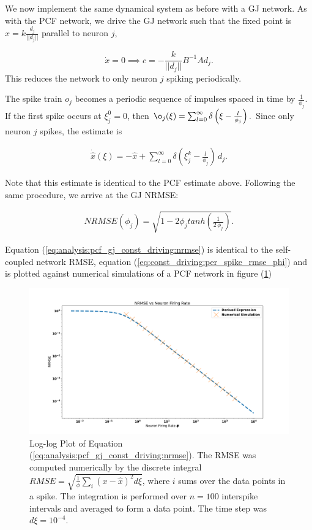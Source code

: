 We now implement the same dynamical system as before with a GJ network. 
As with the PCF network, we drive the GJ network such that the fixed point is $x = k\frac{d_j}{||d_j||}$ parallel to neuron $j$, 

$$
\dot{x} = 0 \implies c = -\frac{k}{||d_j||}B^{-1}A d_j. 
$$
This reduces the network to only neuron $j$ spiking periodically. 

The spike train $o_j$ becomes a periodic sequence of impulses spaced in time by $\frac{1}{\phi_j}$. If the first spike occurs at $\xi_j^0 = 0$, then $\o_j(\xi) = \sum_{l=0}^{\infty} \delta \left(\xi-\frac{l}{\phi_j}\right).$ Since only neuron $j$ spikes, the estimate is

\begin{align*}
\dot{\hat{x}}(\xi) = - \hat{x} + \sum_{l=0}^{\infty} \delta \left(\xi_j^k - \frac{l}{\phi_j}\right) \, d_j .
\end{align*}

Note that this estimate is identical to the PCF estimate above. Following the same procedure, we arrive at the GJ NRMSE:

\begin{align}
\label{eq:analysis:pcf_gj_const_driving:nrmse}
NRMSE(\phi_j) = 
\sqrt{
	1 - 2 \phi_j tanh \left(\frac{1}{2 \, \phi_j} \right)
}. 
\end{align}

Equation (\ref{eq:analysis:pcf_gj_const_driving:nrmse}) is identical to the self-coupled network RMSE, equation (\ref{eq:const_driving:per_spike_rmse_phi}) and is plotted against numerical simulations of a PCF network in figure (\ref{fig:const_driving:gj_nrmse_vs_phi})

\begin{figure}
\centering
\includegraphics[width=\linewidth]{figures/pcf_nrmse_vs_phi}
\caption{Log-log Plot of Equation (\ref{eq:analysis:pcf_gj_const_driving:nrmse}). The RMSE was computed numerically by the discrete integral $RMSE = \sqrt{\frac{1}{\phi} \sum_{i} (x - \hat{x})^2 d\xi}$, where $i$ sums over the data points in a spike. The integration is performed over $n = 100$ interspike intervals and averaged to form a data point. The time step was $d\xi = 10^{-4}$.}
\label{fig:const_driving:gj_nrmse_vs_phi}
\end{figure}


